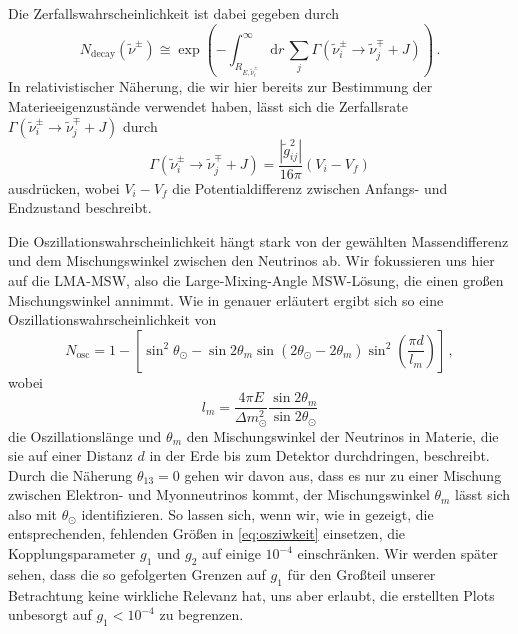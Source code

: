 Die Zerfallswahrscheinlichkeit ist dabei gegeben durch
\begin{equation}
    N_\text{decay}(\tilde{\nu}^\pm) \cong \exp \left(- \int^\infty_{R_{E, \tilde{\nu}^\pm_i}} \mathrm{d}r \, \sum_j \Gamma(\tilde{\nu}^\pm_i \rightarrow \tilde{\nu}^\mp_j + J) \right) \,.
    \label{eq:zerfallswkeit}
\end{equation}
In relativistischer Näherung, die wir hier bereits zur Bestimmung der Materieeigenzustände verwendet haben, lässt sich die Zerfallsrate $\Gamma(\tilde{\nu}^\pm_i \rightarrow \tilde{\nu}^\mp_j + J)$ durch
\begin{equation}
    \Gamma(\tilde{\nu}^\pm_i \rightarrow \tilde{\nu}^\mp_j + J) = \frac{|\tilde{g}^2_{i j}|}{16 \pi} \left(V_i - V_f \right)
    \label{eq:zerfallsrate}
\end{equation}
ausdrücken, wobei $V_i - V_f$ die Potentialdifferenz zwischen Anfangs- und Endzustand beschreibt.

Die Oszillationswahrscheinlichkeit hängt stark von der gewählten Massendifferenz und dem Mischungswinkel zwischen den Neutrinos ab.
Wir fokussieren uns hier auf die LMA-MSW, also die Large-Mixing-Angle MSW-Lösung, die einen großen Mischungswinkel annimmt.
Wie in \cite{ueberlebenswkeit} genauer erläutert ergibt sich so eine Oszillationswahrscheinlichkeit von
\begin{equation}
    N_\text{osc} = 1 - \left[\sin^2\theta_\odot - \sin 2\theta_m \sin\left(2\theta_\odot - 2 \theta_m\right) \sin^2 \left(\frac{\pi d}{l_m}\right)\right] \,,
    \label{eq:osziwkeit}
\end{equation}
wobei
\begin{equation*}
    l_m = \frac{4 \pi E}{\Delta m^2_\odot} \frac{\sin2\theta_m}{\sin2\theta_\odot}
\end{equation*}
die Oszillationslänge und $\theta_m$ den Mischungswinkel der Neutrinos in Materie, die sie auf einer Distanz $d$ in der Erde bis zum Detektor durchdringen, beschreibt.
Durch die Näherung $\theta_{1 3} = 0$ gehen wir davon aus, dass es nur zu einer Mischung zwischen Elektron- und Myonneutrinos kommt, der Mischungswinkel $\theta_m$ lässt sich also mit $\theta_\odot$ identifizieren.
So lassen sich, wenn wir, wie in \cite{supernovaboundsdasandere} gezeigt, die entsprechenden, fehlenden Größen in \eqref{eq:osziwkeit} einsetzen, die Kopplungsparameter $g_1$ und $g_2$ auf einige $10^{-4}$ einschränken.
Wir werden später sehen, dass die so gefolgerten Grenzen auf $g_1$ für den Großteil unserer Betrachtung keine wirkliche Relevanz hat, uns aber erlaubt, die erstellten Plots unbesorgt auf $g_1 < 10^{-4}$ zu begrenzen. 


